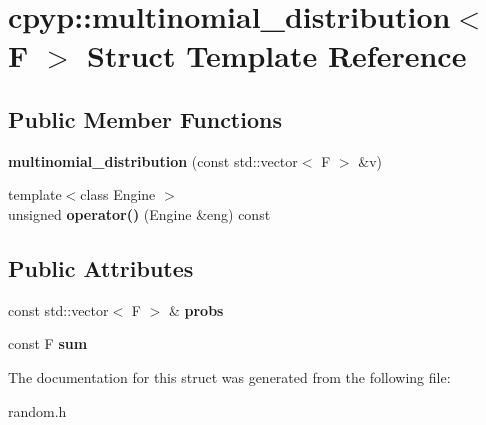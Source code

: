\hypertarget{structcpyp_1_1multinomial__distribution}{}\section{cpyp\+:\+:multinomial\+\_\+distribution$<$ F $>$ Struct Template Reference}
\label{structcpyp_1_1multinomial__distribution}
\subsection*{Public Member Functions}
\begin{DoxyCompactItemize}
\item 
\mbox{\label{structcpyp_1_1multinomial__distribution_ab5853e699f1dbc23dddb36c63dd83888}} 
{\bfseries multinomial\+\_\+distribution} (const std\+::vector$<$ F $>$ \&v)
\item 
\mbox{\label{structcpyp_1_1multinomial__distribution_aa1833522472255ef12889dfd6437c9cb}} 
{\footnotesize template$<$class Engine $>$ }\\unsigned {\bfseries operator()} (Engine \&eng) const
\end{DoxyCompactItemize}
\subsection*{Public Attributes}
\begin{DoxyCompactItemize}
\item 
\mbox{\label{structcpyp_1_1multinomial__distribution_a65244e5dffdb1d4009e30fab7cd9894c}} 
const std\+::vector$<$ F $>$ \& {\bfseries probs}
\item 
\mbox{\label{structcpyp_1_1multinomial__distribution_a9f8fa8d7878356b92a4a36148f501216}} 
const F {\bfseries sum}
\end{DoxyCompactItemize}


The documentation for this struct was generated from the following file\+:\begin{DoxyCompactItemize}
\item 
random.\+h\end{DoxyCompactItemize}

